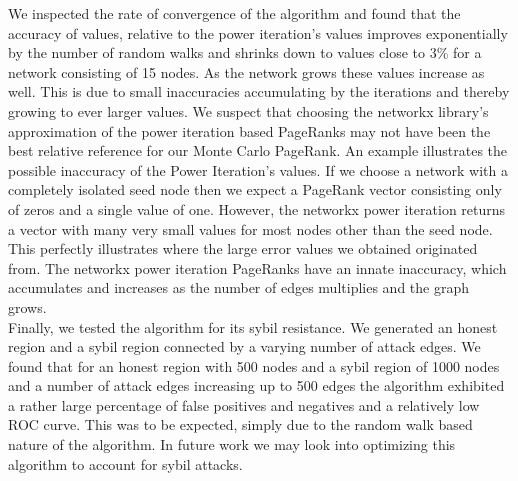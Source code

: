 \documentclass[sigconf]{acmart}
\theoremstyle{definition}
\begin{document}
\noindent We inspected the rate of convergence of the algorithm and found that the accuracy of values, relative to the power iteration's values improves exponentially by the number of random walks and shrinks down to values close to $3\%$ for a network consisting of 15 nodes. As the network grows these values increase as well. This is due to small inaccuracies accumulating by the iterations and thereby growing to ever larger values. We suspect that choosing the networkx library's approximation of the power iteration based PageRanks may not have been the best relative reference for our Monte Carlo PageRank. An example illustrates the possible inaccuracy of the Power Iteration's values. If we choose a network with a completely isolated seed node then we expect a PageRank vector consisting only of zeros and a single value of one. However, the networkx power iteration returns a vector with many very small values for most nodes other than the seed node. This perfectly illustrates where the large error values we obtained originated from. The networkx power iteration PageRanks have an innate inaccuracy, which accumulates and increases as the number of edges multiplies and the graph grows. \vspace{1em}\\

\noindent Finally, we tested the algorithm for its sybil resistance. We generated an honest region and a sybil region connected by a varying number of attack edges. We found that for an honest region with 500 nodes and a sybil region of 1000 nodes and a number of attack edges increasing up to 500 edges the algorithm exhibited a rather large percentage of false positives and negatives and a relatively low ROC curve. This was to be expected, simply due to the random walk based nature of the algorithm. In future work we may look into optimizing this algorithm to account for sybil attacks.
\end{document}
